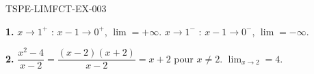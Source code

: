 \begin{corrige}{TSPE-LIMFCT-EX-003}

\textbf{1.} $x \to 1^+$ : $x-1 \to 0^+$, $\boxed{\lim = +\infty}$. $x \to 1^-$ : $x-1 \to 0^-$, $\boxed{\lim = -\infty}$.


\textbf{2.} $\dfrac{x^2-4}{x-2} = \dfrac{(x-2)(x+2)}{x-2} = x+2$ pour $x
\neq 2$. $\lim_{x \to 2} = \boxed{4}$.

\end{corrige}
